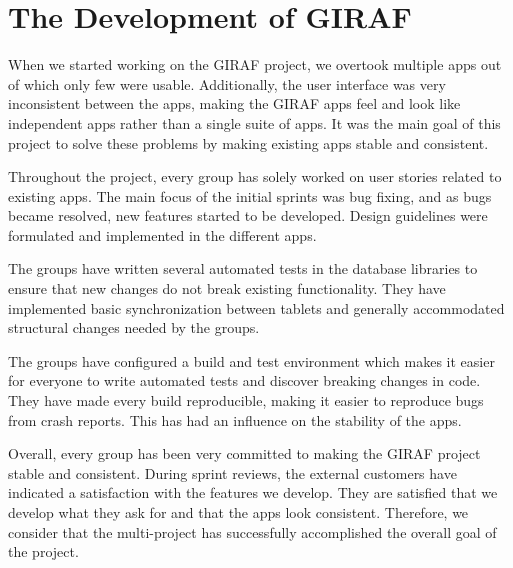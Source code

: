 \section{The Development of GIRAF}\label{conc:multi_project_eval}
When we started working on the GIRAF project, we overtook multiple apps out of which only few were usable. Additionally, the user interface was very inconsistent between the apps, making the GIRAF apps feel and look like independent apps rather than a single suite of apps. It was the main goal of this project to solve these problems by making existing apps stable and consistent.

Throughout the project, every \gui{} group has solely worked on user stories related to existing apps. The main focus of the initial sprints was bug fixing, and as bugs became resolved, new features started to be developed. Design guidelines were formulated and implemented in the different apps.

The \db{} groups have written several automated tests in the database libraries to ensure that new changes do not break existing functionality. They have implemented basic synchronization between tablets and generally accommodated structural changes needed by the \gui{} groups.

The \bd{} groups have configured a build and test environment which makes it easier for everyone to write automated tests and discover breaking changes in code. They have made every build reproducible, making it easier to reproduce bugs from crash reports. This has had an influence on the stability of the apps.

Overall, every group has been very committed to making the GIRAF project stable and consistent. During sprint reviews, the external customers have indicated a satisfaction with the features we develop. They are satisfied that we develop what they ask for and that the apps look consistent. Therefore, we consider that the multi-project has successfully accomplished the overall goal of the project.
